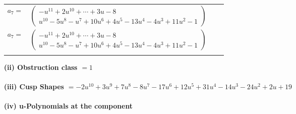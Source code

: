 \documentclass[1p]{elsarticle_modified}
\theoremstyle{definition}
\begin{document}
\begin{tabular}{m{7pt} m{180pt} m{7pt} m{180pt} }
\flushright $a_{7}=$&$\begin{pmatrix}- u^{11}+2 u^{10}+\cdots+3 u-8\\u^{10}-5 u^8- u^7+10 u^6+4 u^5-13 u^4-4 u^3+11 u^2-1\end{pmatrix}$\\ \flushright $a_{7}=$&$\begin{pmatrix}- u^{11}+2 u^{10}+\cdots+3 u-8\\u^{10}-5 u^8- u^7+10 u^6+4 u^5-13 u^4-4 u^3+11 u^2-1\end{pmatrix}$\\&\end{tabular}
\flushleft \textbf{(ii) Obstruction class $= 1$}\\~\\
\flushleft \textbf{(iii) Cusp Shapes $= -2 u^{10}+3 u^9+7 u^8-8 u^7-17 u^6+12 u^5+31 u^4-14 u^3-24 u^2+2 u+19$}\\~\\
\newpage\renewcommand{\arraystretch}{1}
\flushleft \textbf{(iv) u-Polynomials at the component}\newline \\
\end{document}
